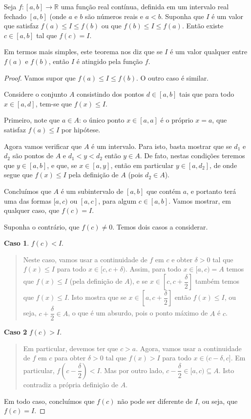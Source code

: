 \begin{theorem}
Seja $f\colon [a,b]\to\mathbb{R}$ uma função real contínua, definida em um intervalo real fechado $[a,b]$ (onde $a$ e $b$ são números reais e $a < b$. Suponha que $I$ é um valor que satisfaz $f(a)\leq I\leq f(b)$ ou que $f(b)\leq I\leq f(a)$. Então existe $c\in[a,b]$ tal que $f(c)=I$.
\end{theorem}

Em termos mais simples, este teorema nos diz que se $I$ é um valor qualquer entre $f(a)$ e $f(b)$, então $I$ é atingido pela função $f$.

\begin{proof}
Vamos supor que $f(a)\leq I\leq f(b)$. O outro caso é similar.

Considere o conjunto $A$ consistindo dos pontos $d\in [a,b]$ tais que para todo $x\in[a,d]$, tem-se que $f(x)\leq I$.

Primeiro, note que $a\in A$: o único ponto $x\in[a,a]$ é o próprio $x=a$, que satisfaz $f(a)\leq I$ por hipótese.

Agora vamos verificar que $A$ é um intervalo. Para isto, basta mostrar que se $d_1$ e $d_2$ são pontos de $A$ e $d_1 < y < d_2$ então $y\in A$. De fato, nestas condições teremos que $y\in[a,b]$, e que, se $x\in[a,y]$, então em particular $y\in [a,d_2]$, de onde segue que $f(x)\leq I$ pela definição de $A$ (pois $d_2\in A$).

Concluímos que $A$ é um subintervalo de $[a,b]$ que contém $a$, e portanto terá uma das formas $[a,c)$ ou $[a,c]$, para algum $c\in[a,b]$. Vamos mostrar, em qualquer caso, que $f(c)=I$.

Suponha o contrário, que $f(c)\neq 0$. Temos dois casos a considerar.

\textbf{Caso 1}. $f(c) < I$.

\begin{quote}
Neste caso, vamos usar a continuidade de $f$ em $c$ e obter $\delta>0$ tal que $f(x)\leq I$ para todo $x\in[c,c+\delta)$. Assim, para todo $x\in[a,c)=A$ temos que $f(x)\leq I$ (pela definição de $A$), e se $x\in\left[c,c+\dfrac{\delta}{2}\right]$ também temos que $f(x)\leq I$. Isto mostra que se $x\in\left[a,c+\dfrac{\delta}{2}\right]$ então $f(x)\leq I$, ou seja, $c+\dfrac{\delta}{2}\in A$, o que é um absurdo, pois o ponto máximo de $A$ é $c$.
\end{quote}

\textbf{Caso 2} $f(c)>I$.

\begin{quote}
Em particular, devemos ter que $c>a$. Agora, vamos usar a continuidade de $f$ em $c$ para obter $\delta>0$ tal que $f(x)>I$ para todo $x\in (c-\delta,c]$. Em particular, $f\left(c-\dfrac{\delta}{2}\right) < I$. Mas por outro lado, $c-\dfrac{\delta}{2}\in [a,c)\subseteq A$. Isto contradiz a própria definição de $A$.
\end{quote}

Em todo caso, concluímos que $f(c)$ não pode ser diferente de $I$, ou seja, que $f(c)=I$.
\end{proof}